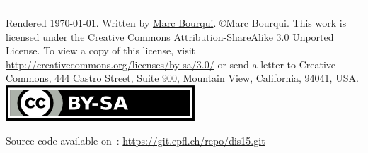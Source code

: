 \documentclass[12pt,a4paper]{exam} %
\begin{document}
\hrule
\tiny
Rendered \today. Written by \href{http://people.epfl.ch/marc.bourqui}{Marc Bourqui}.
\copyright Marc Bourqui. This work is licensed under the Creative Commons Attribution-ShareAlike 3.0 Unported License.
To view a copy of this license, visit \href{http://creativecommons.org/licenses/by-sa/3.0/}{http://creativecommons.org/licenses/by-sa/3.0/} or
send a letter to Creative Commons, 444 Castro Street, Suite 900, Mountain View, California, 94041, USA.
\includegraphics{by-sa.png}

Source code available on~: \href{https://git.epfl.ch/repo/dis15.git}{https://git.epfl.ch/repo/dis15.git}
\end{document}
